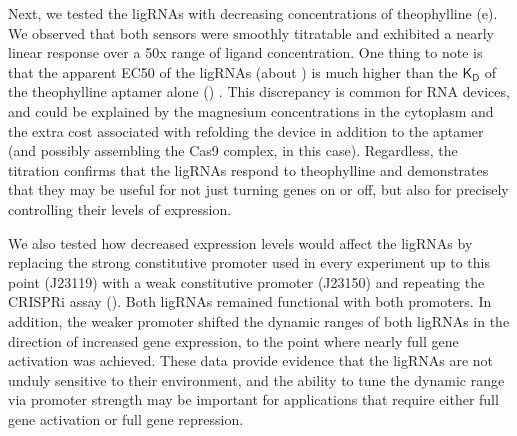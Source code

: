 \documentclass[10pt,oneside]{article}
\begin{document}


Next, we tested the ligRNAs with decreasing concentrations of theophylline (e).  We observed that both sensors were smoothly titratable and exhibited a nearly linear response over a 50x range of ligand concentration.  One thing to note is that the apparent EC50 of the ligRNAs (about ) is much higher than the $\mathsf{K_D}$ of the theophylline aptamer alone () \autocite{jenison1994}.  This discrepancy is common for RNA devices, and could be explained by the magnesium concentrations in the cytoplasm \autocite{carothers2010} and the extra cost associated with refolding the device in addition to the aptamer (and possibly assembling the Cas9 complex, in this case).  Regardless, the titration confirms that the ligRNAs respond to theophylline and demonstrates that they may be useful for not just turning genes on or off, but also for precisely controlling their levels of expression.
% 
% 
% 
% 


We also tested how decreased expression levels would affect the ligRNAs by replacing the strong constitutive promoter used in every experiment up to this point (J23119) with a weak constitutive promoter (J23150) and repeating the CRISPRi assay ().  Both ligRNAs remained functional with both promoters.  In addition, the weaker promoter shifted the dynamic ranges of both ligRNAs in the direction of increased gene expression, to the point where nearly full gene activation was achieved.  These data provide evidence that the ligRNAs are not unduly sensitive to their environment, and the ability to tune the dynamic range via promoter strength may be important for applications that require either full gene activation or full gene repression.
\end{document}
